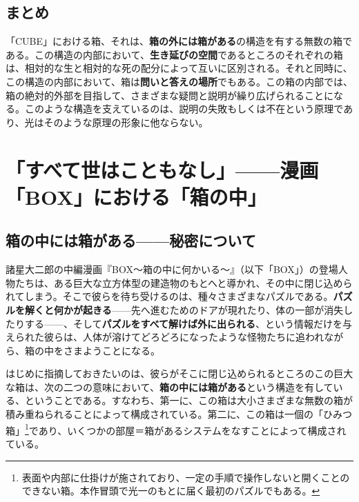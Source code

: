 \documentclass[a4paper]{jsarticle}
\begin{document}
\subsection*{まとめ}

「CUBE」における箱、それは、\textbf{箱の外には箱がある}の構造を有する無数の箱である。この構造の内部において、\textbf{生き延びの空間}であるところのそれぞれの箱は、相対的な生と相対的な死の配分によって互いに区別される。それと同時に、この構造の内部において、箱は\textbf{問いと答えの場所}でもある。この箱の内部では、箱の絶対的外部を目指して、さまざまな疑問と説明が繰り広げられることになる。このような構造を支えているのは、説明の失敗もしくは不在という原理であり、光はそのような原理の形象に他ならない。

\section{「すべて世はこともなし」------漫画「BOX」における「箱の中」}


\subsection{箱の中には箱がある------秘密について}

諸星大二郎の中編漫画『BOX～箱の中に何かいる～』（以下「BOX」）の登場人物たちは、ある巨大な立方体型の建造物のもとへと導かれ、その中に閉じ込められてしまう。そこで彼らを待ち受けるのは、種々さまざまなパズルである。\textbf{パズルを解くと何かが起きる}------先へ進むためのドアが現れたり、体の一部が消失したりする------、そして\textbf{パズルをすべて解けば外に出られる}、という情報だけを与えられた彼らは、人体が溶けてどろどろになったような怪物たちに追われながら、箱の中をさまようことになる。

はじめに指摘しておきたいのは、彼らがそこに閉じ込められるところのこの巨大な箱は、次の二つの意味において、\textbf{箱の中には箱がある}という構造を有している、ということである。すなわち、第一に、この箱は大小さまざまな無数の箱が積み重ねられることによって構成されている。第二に、この箱は一個の「ひみつ箱」\footnote{表面や内部に仕掛けが施されており、一定の手順で操作しないと開くことのできない箱。本作冒頭で光一のもとに届く最初のパズルでもある。}であり、いくつかの部屋＝箱があるシステムをなすことによって構成されている。
\end{document}
